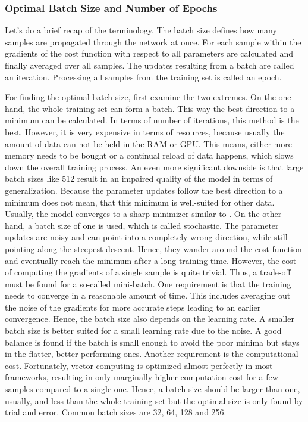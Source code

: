 \subsubsection{Optimal Batch Size and Number of Epochs}
\label{sec:improving-performance-batch-size}
Let's do a brief recap of the terminology.
The batch size defines how many samples are propagated through the network at once.
For each sample within the gradients of the cost function with respect to all parameters are calculated and finally averaged over all samples.
The updates resulting from a batch are called an iteration.
Processing all samples from the training set is called an epoch.

For finding the optimal batch size, first examine the two extremes.
On the one hand, the whole training set can form a batch.
This way the best direction to a minimum can be calculated.
In terms of number of iterations, this method is the best.
However, it is very expensive in terms of resources, because usually the amount of data can not be held in the RAM or GPU.
This means, either more memory needs to be bought or a continual reload of data happens, which slows down the overall training process.
An even more significant downside is that large batch sizes like 512 result in an impaired quality of the model in terms of generalization\cite{DBLP:journals/corr/KeskarMNST16}.
Because the parameter updates follow the best direction to a minimum does not mean, that this minimum is well-suited for other data.
Usually, the model converges to a sharp minimizer similar to .
On the other hand, a batch size of one is used, which is called stochastic.
The parameter updates are noisy and can point into a completely wrong direction, while still pointing along the steepest descent.
Hence, they wander around the cost function and eventually reach the minimum after a long training time.
However, the cost of computing the gradients of a single sample is quite trivial.
Thus, a trade-off must be found for a so-called mini-batch.
One requirement is that the training needs to converge in a reasonable amount of time.
This includes averaging out the noise of the gradients for more accurate steps leading to an earlier convergence.
Hence, the batch size also depends on the learning rate.
A smaller batch size is better suited for a small learning rate due to the noise.
A good balance is found if the batch is small enough to avoid the poor minima but stays in the flatter, better-performing ones.
Another requirement is the computational cost.
Fortunately, vector computing is optimized almost perfectly in most frameworks, resulting in only marginally higher computation cost for a few samples compared to a single one.
Hence, a batch size should be larger than one, usually, and less than the whole training set but the optimal size is only found by trial and error.
Common batch sizes are 32, 64, 128 and 256.

